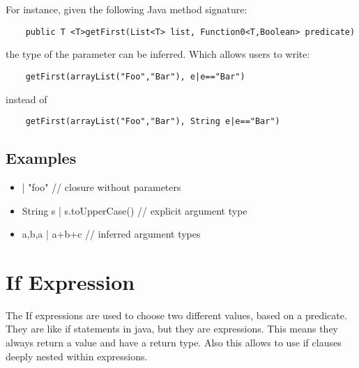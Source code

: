 \documentclass[a4paper,10pt]{scrreprt}
\newlength{\itemindentlen}
\begin{document}
For instance, given the following Java method signature:
\begin{lstlisting}
	public T <T>getFirst(List<T> list, Function0<T,Boolean> predicate) 

\end{lstlisting}
 

the type of the parameter can be inferred. Which allows users to write:
\begin{lstlisting}
	getFirst(arrayList("Foo","Bar"), e|e=="Bar")

\end{lstlisting}

instead of 
\begin{lstlisting}
	getFirst(arrayList("Foo","Bar"), String e|e=="Bar")

\end{lstlisting}





\subsection{Examples}

\setlength{\itemindentlen}{\textwidth}
\begin{itemize}
\addtolength{\itemindentlen}{-2em}

\item \begin{minipage}[t]{\itemindentlen}
| "foo"   // closure without parameters
\end{minipage}

\item \begin{minipage}[t]{\itemindentlen}
String s | s.toUpperCase() // explicit argument type
\end{minipage}

\item \begin{minipage}[t]{\itemindentlen}
a,b,a | a+b+c  // inferred argument types
\end{minipage}

\end{itemize}
\addtolength{\itemindentlen}{2em}







\section{If Expression\label{IfExpression}}
The If expressions are used to choose two different values, based on a predicate.
They are like if statements in java, but they are expressions. This means they always return a value and have a return type. Also this allows
to use if clauses deeply nested within expressions. 
\end{document}
